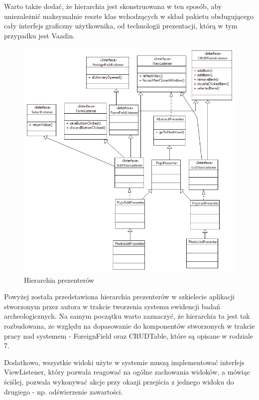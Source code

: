 Warto także dodać, że hierarchia jest skonstruowana w ten sposób, aby uniezależnić maksymalnie reszte klas wchodzących w skład pakietu obsługującego cały interfejs graficzny użytkownika, od technologii prezentacji, którą w tym przypadku jest Vaadin.

\newpage
\begin{figure} [H]
    \begin{center}
	\includegraphics[scale=.6]{img/presenterDiagram.png}
	\caption{Hierarchia prezenterów}
	\label{presenterHierarchy}
    \end{center}
\end{figure}

Powyżej została przedstawiona hierarchia prezenterów w szkielecie aplikacji stworzonym przez autora w trakcie tworzenia systemu ewidencji badań archeologicznych. Na samym początku warto zaznaczyć, że hierarchia ta jest tak rozbudowana, ze względu na dopasowanie do komponentów stworzonych w trakcie pracy nad systemem - ForeignField oraz CRUDTable, które są opisane w rodziale 7.

Dodatkowo, wszystkie widoki użyte w systemie muszą implementować interfejs ViewListener, który pozwala reagować na ogólne zachowania widoków, a mówiąc ściślej, pozwala wykonywać akcje przy okazji przejścia z jednego widoku do drugiego - np. odświerzenie zawartości. 

